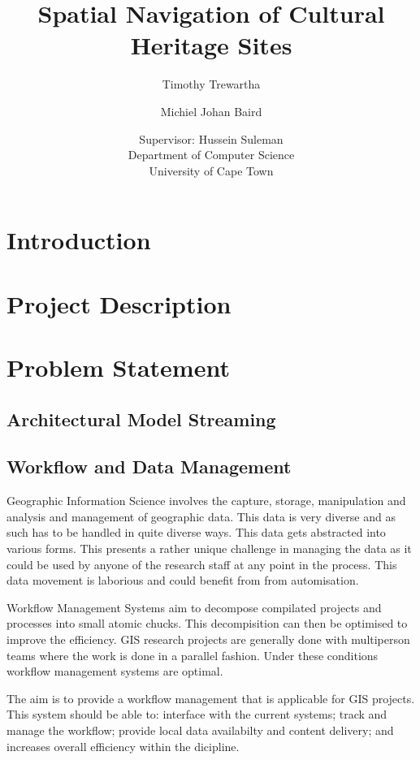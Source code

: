 \documentclass[12pt,a4paper]{article}
\begin{document}
\author{Timothy Trewartha \\
\and
Michiel Johan Baird \\
\and
Supervisor: Hussein Suleman \\
Department of Computer Science \\
University of Cape Town
 }
\title{Spatial Navigation of Cultural Heritage Sites}
\maketitle
{}
\tableofcontents
\newpage

\section{Introduction}
\section{Project Description}
\section{Problem Statement}
\subsection{Architectural Model Streaming}
\subsection{Workflow and Data Management}
Geographic Information Science involves the capture, storage, manipulation and analysis
and management of geographic data. This data is very diverse and as such has to be handled
in quite diverse ways. This data gets abstracted into various forms. This presents a
rather unique challenge in managing the data as it could be used by anyone of the research
staff at any point in the process. This data movement is laborious and could benefit from
from automisation.

Workflow Management Systems aim to decompose compilated projects and processes into
small atomic chucks. This decompisition can then be optimised to improve the efficiency.
GIS research projects are generally done with multiperson teams where the work is
done in a parallel fashion. Under these conditions workflow management systems
are optimal.

The aim is to provide a workflow management that is applicable for GIS projects.
This system should be able to: interface with the current systems; track and
manage the workflow; provide local data availabilty and content delivery; and
increases overall efficiency within the dicipline.
\end{document}
